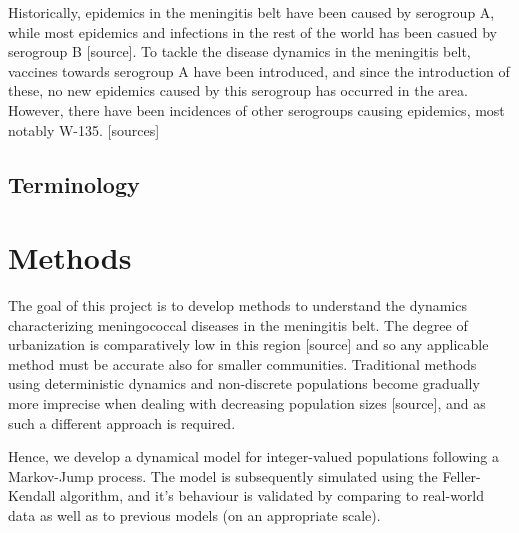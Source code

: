 \documentclass[10pt,a4paper]{article}
\begin{document}
Historically, epidemics in the meningitis belt have been caused by serogroup A, while most epidemics and infections in the rest of the world has been casued by serogroup B [source]. To tackle the disease dynamics in the meningitis belt, vaccines towards serogroup A have been introduced, and since the introduction of these, no new epidemics caused by this serogroup has occurred in the area. However, there have been incidences of other serogroups causing epidemics, most notably W-135. [sources]




\subsection{Terminology}

\section{Methods}

The goal of this project is to develop methods to understand the dynamics characterizing meningococcal diseases in the meningitis belt. The degree of urbanization is comparatively low in this region [source] and so any applicable method must be accurate also for smaller communities. Traditional methods using deterministic dynamics and non-discrete populations become gradually more imprecise when dealing with decreasing population sizes [source], and as such a different approach is required.

Hence, we develop a dynamical model for integer-valued populations following a Markov-Jump process. The model is subsequently simulated using the Feller-Kendall algorithm, and it's behaviour is validated by comparing to real-world data as well as to previous models (on an appropriate scale).
\end{document}
